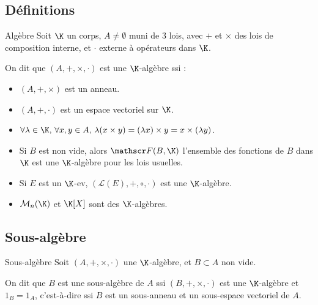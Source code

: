 \subsection{Définitions}

\begin{definition}{Algèbre}{}
    Soit $\K$ un corps, $A \neq \emptyset$ muni de 3 lois, avec $+$ et $\times$ des lois de composition interne, 
    et $\cdot$ externe à opérateurs dans $\K$.

    On dit que $(A, +, \times, \cdot)$ est une $\K$-algèbre ssi :
    \begin{itemize}
        \item $(A, +, \times)$ est un anneau.
        \item $(A, +, \cdot)$ est un espace vectoriel sur $\K$.
        \item $\forall \lambda \in \K, \, \forall x, y \in A, \, \lambda (x \times y) = (\lambda x) \times y = x \times (\lambda y)$.
    \end{itemize}

\end{definition}

\begin{exemple}
    \begin{itemize}
        \item Si $B$ est non vide, alors $\mathscr F(B, \K)$ l'ensemble des fonctions de $B$ dans $\K$ est une $\K$-algèbre
        pour les lois usuelles.

        \item Si $E$ est un $\K$-ev, $(\mathcal L(E), +, \circ, \cdot)$ est une $\K$-algèbre.
        
        \item $\mathcal M_n(\K)$ et $\K[X]$ sont des $\K$-algèbres.
    \end{itemize}
\end{exemple}

\subsection{Sous-algèbre}

\begin{definition}{Sous-algèbre}{}
    Soit $(A, +, \times, \cdot)$ une $\K$-algèbre, et $B \subset A$ non vide. 

    On dit que $B$ est une sous-algèbre de $A$ ssi $(B, +, \times, \cdot)$ est une $\K$-algèbre 
    et $1_B = 1_A$, c'est-à-dire ssi $B$ est un sous-anneau et un sous-espace vectoriel de $A$.
\end{definition}

